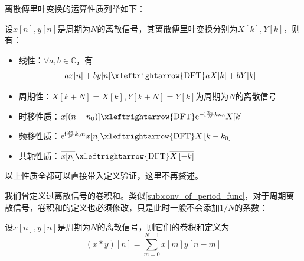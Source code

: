 \documentclass{ctexbook}
\begin{document}
离散傅里叶变换的运算性质列举如下：
\begin{proposition}[离散傅里叶变换的运算性质]
    设$x[n],y[n]$是周期为$N$的离散信号，其离散傅里叶变换分别为$X[k],Y[k]$，则有：\begin{itemize}
        \item  线性：$\forall a,b\in\mathbb{C}$，有
    \[a x[n]+b y[n]\xleftrightarrow{\text{DFT}} a X[k]+b Y[k]\]
        \item 周期性：$X[k+N]=X[k],Y[k+N]=Y[k]$为周期为$N$的离散信号
        \item 时移性质：$x[(n-n_0)]\xleftrightarrow{\text{DFT}}\mathrm{e}^{-\mathrm{i}\frac{2\pi}{N}kn_0}X[k]$
        \item 频移性质：$\mathrm{e}^{\mathrm{i}\frac{2\pi}{N}k_0 n}x[n]\xleftrightarrow{\text{DFT}}X\left[k-k_0\right]$
        \item 共轭性质：$\overline{x[n]}\xleftrightarrow{\text{DFT}}\overline{X\left[-k\right]}$
    \end{itemize}
\end{proposition}

以上性质全都可以直接带入定义验证，这里不再赘述。

我们曾定义过离散信号的卷积和。类似\ref{sub:conv_of_period_func}，对于周期离散信号，卷积和的定义也必须修改，只是此时一般不会添加$1/N$的系数：
\begin{definition}[周期离散信号的卷积和]
    设$x[n],y[n]$是周期为$N$的离散信号，则它们的卷积和定义为
    \[(x*y)[n]=\sum_{m=0}^{N-1}x[m]y[n-m]\]
\end{definition}
\end{document}
